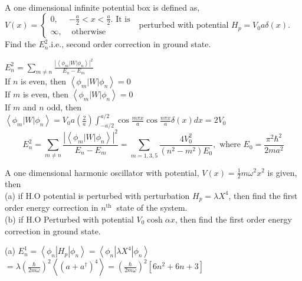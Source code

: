 \begin{enumerate}
\begin{answer}
\begin{align*}
  \end{align*}
 \end{answer}
	\begin{minipage}{\textwidth}
	\item A one dimensional infinite potential box is defined as, $V(x)= \begin{cases}0, & -\frac{a}{2}<x<\frac{a}{2} . \text { It is } \\ \infty, & \text { otherwise }\end{cases}$ perturbed with potential $H_{p}=V_{0} a \delta(x)$. Find the $E_{n}^{2}$.i.e., second order correction in ground state.
\end{minipage}
\begin{answer}
	$E_{n}^{2}=\sum_{m \neq n} \frac{\left|\left\langle\phi_{m}|W| \phi_{n}\right\rangle\right|^{2}}{E_{n}-E_{m}}$\\
	If $n$ is even, then $\left\langle\phi_{m}|W| \phi_{n}\right\rangle=0$\\
	If $m$ is even, then $\left\langle\phi_{m}|W| \phi_{n}\right\rangle=0$\\
	If $m$ and $n$ odd, then $\left\langle\phi_{m}|W| \phi_{n}\right\rangle=V_{0} a\left(\frac{2}{a}\right)\int_{-a / 2}^{a / 2} \cos \frac{m \pi x}{a} \cos \frac{n \pi x}{a} \delta(x) d x=2 V_{0}$
	$$
	E_{n}^{2}=\sum_{m \neq n} \frac{\left|\left\langle\phi_{m}|W| \phi_{n}\right\rangle\right|^{2}}{E_{n}-E_{m}}=\sum_{m=1,3,5} \frac{4 V_{0}^{2}}{\left(n^{2}-m^{2}\right) E_{0}}, \text { where } E_{0}=\frac{\pi^{2} \hbar^{2}}{2 m a^{2}}
	$$
\end{answer}
	\begin{minipage}{\textwidth}
	\item A one dimensional harmonic oscillator with potential, $V(x)=\frac{1}{2} m \omega^{2} x^{2}$ is given, then\\
	(a) if H.O potential is perturbed with perturbation $H_{p}=\lambda X^{4}$, then find the first order energy correction in $n^{\text {th }}$ state of the system.\\
	(b) if H.O Perturbed with potential $V_{0} \cosh \alpha x$, then find the first order energy correction in ground state.
\end{minipage}
\begin{answer}
(a)	$E_{n}^{1}=\left\langle\phi_{n}\left|H_{p}\right| \phi_{n}\right\rangle=\left\langle\phi_{n}\left|\lambda X^{4}\right| \phi_{n}\right\rangle$\\
	$=\lambda\left(\frac{\hbar}{2 m \omega}\right)^{2}\left\langle\left(a+a^{\dagger}\right)^{4}\right\rangle=\left(\frac{\hbar}{2 m \omega}\right)^{2}\left[6 n^{2}+6 n+3\right]$\\

\end{answer}
\end{enumerate}
